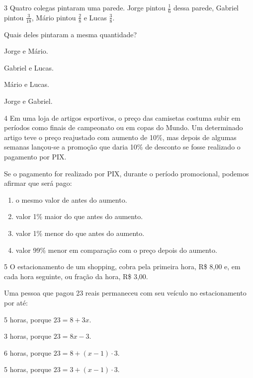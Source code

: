 \num{3} Quatro colegas pintaram uma parede. Jorge pintou $\frac{1}{6}$ dessa parede, Gabriel pintou $\frac{3}{18}$, Mário pintou $\frac{2}{8}$ e Lucas $\frac{3}{8}$.

Quais deles pintaram a mesma quantidade?

\begin{escolha}

  \item Jorge e Mário.

  \item Gabriel e Lucas.

  \item Mário e Lucas.

  \item Jorge e Gabriel.

\end{escolha}

\num{4} Em uma loja de artigos esportivos, o preço das camisetas costuma 
subir em períodos como finais de campeonato ou em copas do Mundo. Um determinado
artigo teve o preço reajustado com aumento de 10\%, mas depois de algumas semanas
lançou-se a promoção que daria 10\% de desconto se fosse realizado o
pagamento por PIX.

Se o pagamento for realizado por PIX, durante o período promocional,
podemos afirmar que será pago:

\begin{enumerate}

\item o mesmo valor de antes do aumento.

\item valor 1\% maior do que antes do aumento.

\item valor 1\% menor do que antes do aumento.

\item valor 99\% menor em comparação com o preço depois do aumento.

\end{enumerate}


\num{5} O estacionamento de um shopping, cobra pela primeira hora, R\$ 8,00 e, em cada hora seguinte,
ou fração da hora, R\$ 3,00.

Uma pessoa que pagou 23 reais permaneceu com seu veículo no estacionamento por até:

\begin{escolha}
  
  \item 5 horas, porque $23 = 8 + 3x$.

  \item 3 horas, porque $23 = 8x - 3$.

  \item 6 horas, porque $23 = 8 + (x - 1) \cdot 3$.

  \item 5 horas, porque $23 = 3 + (x - 1) \cdot 3$.

\end{escolha}


